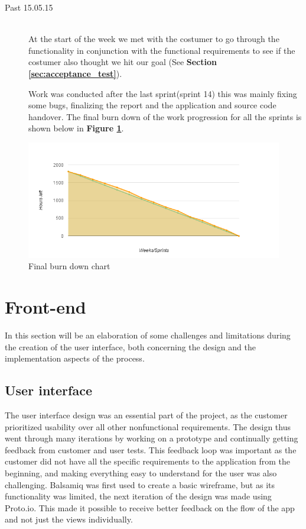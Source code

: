\begin{description}
	\item[Past 15.05.15] \hfill \\ 
	At the start of the week we met with the costumer to go through the functionality in conjunction with the functional requirements to see if the costumer also thought we hit our goal (See \textbf {Section \ref{sec:acceptance_test}}).\newline
	  
	Work was conducted after the last sprint(sprint 14) this was mainly fixing some bugs, finalizing the report and the application and source code handover. The final burn down of the work progression for all the sprints is shown below in \textbf {Figure \ref{Fig:burnDownAfter}}.
	
\end{description}

\begin{figure}[h!]
	\centering
	\includegraphics[width=\textwidth]{fig/burnDownAfter}
	\caption{Final burn down chart}
	\label{Fig:burnDownAfter}
\end{figure}

\section{Front-end}

In this section will be an elaboration of some challenges and limitations during the creation of the user interface, both concerning the design and the implementation aspects of the process.

\subsection{User interface}
\label{subsec:user_interface}
The user interface design was an essential part of the project, as the customer prioritized usability over all other nonfunctional requirements. The design thus went through many iterations by working on a prototype and continually getting feedback from customer and user tests. This feedback loop was important as the customer did not have all the specific requirements to the application from the beginning, and making everything easy to understand for the user was also challenging. Balsamiq was first used to create a basic wireframe, but as its functionality was limited, the next iteration of the design was made using Proto.io. This made it possible to receive better feedback on the flow of the app and not just the views individually. \newline

